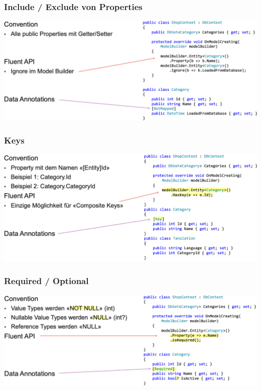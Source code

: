 \subsubsection{Include / Exclude von Properties}
\begin{center}
    \includegraphics[scale=.35]{graphic/efc/Include Exclude von Properties.png}
\end{center}
\vspace{-8pt}

\subsubsection{Keys}
\begin{center}
    \includegraphics[scale=.37]{graphic/efc/Keys.png}
\end{center}
\vspace{-8pt}

\subsubsection{Required / Optional}
\begin{center}
    \includegraphics[scale=.37]{graphic/efc/Required Optional.png}
\end{center}
\vspace{-8pt}

